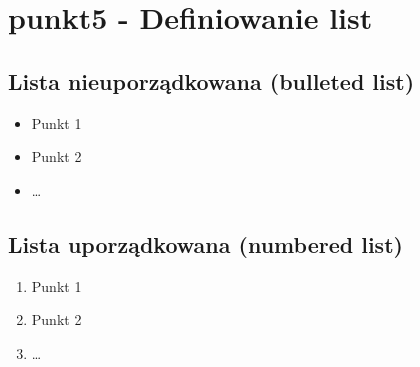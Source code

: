 \chapter{punkt5 - Definiowanie list}
\section{Lista nieuporządkowana (bulleted list)}
\begin{itemize}
	\item Punkt 1
	\item Punkt 2
	\item \ldots
\end{itemize}

\section{Lista uporządkowana (numbered list)}
\begin{enumerate}
	\item Punkt 1
	\item Punkt 2
	\item \ldots
\end{enumerate}